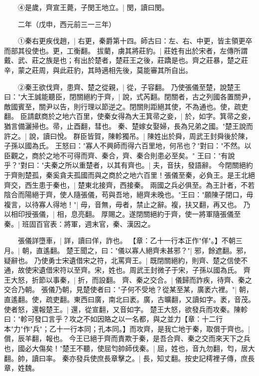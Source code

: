 　　④是歲，齊宣王薨，子閔王地立。|{
	閔，讀曰閔。
	}

　　二年（戊申，西元前三一三年）

　　①秦右更疾伐趙，|{
	右更，秦爵第十四。師古曰：左、右、中更，皆主領更卒而部其役使也。更，工衡翻。
	}
拔藺，虜其將莊豹。|{
	莊姓有出於宋者，左傳所謂戴、武、莊之族是也；有出於楚者，楚莊王之後，莊蹻是也。齊之莊暴，楚之莊辛，蒙之莊周，與此莊豹，其時適相先後，莫能審其所自出。
	}

　　②秦王欲伐齊，患齊、楚之從親，|{
	從，子容翻。
	}
乃使張儀至楚，說楚王曰："大王誠能聽臣，閉關絕約于齊，|{
	說，式芮翻。閉關者，古之列國各置關尹，敵國賓至，關尹以告，則行理以節逆之。閉關則距絕其使，不為通也。使，疏吏翻。
	}
臣請獻商於之地六百里，使秦女得為大王箕帚之妾，|{
	於，如字。箕帚之妾，猶言備灑掃也。帚，止酉翻，彗也。
	}
秦、楚嫁女娶婦，長為兄弟之國。"楚王說而許之。|{
	說，讀曰悅。
	}
群臣皆賀，陳軫獨吊。|{
	陳姓出於舜，周武王封舜後於陳，子孫以國為氏。
	}
王怒曰："寡人不興師而得六百里地，何吊也？"對曰："不然。以臣觀之，商於之地不可得而齊、秦合，齊、秦合則患必至矣。" 王曰："有說乎？"對曰："夫秦之所以重楚者，以其有齊也。|{
	夫，音扶，發語辭。
	}
今閉關絕約于齊則楚孤，秦奚貪夫孤國而與之商於之地六百里！張儀至秦，必負王。是王北絕齊交，西生患于秦也，|{
	楚東北接齊，西接秦。
	}
兩國之兵必俱至。為王計者，不若陰合而陽絕于齊，使人隨張儀，苟與吾地，絕齊未晚也。"王曰："願陳子閉口，毋複言，以待寡人得地！"|{
	毋，音無，毋者，禁止之辭。複，扶又翻，再又也。
	}
乃以相印授張儀，|{
	相，息亮翻。
	}
厚賜之。遂閉關絕約于齊，使一將軍隨張儀至秦。|{
	班固百官表：將軍，週末官，秦、漢因之。
	}

　　張儀詳墮車，|{
	詳，讀曰佯，詐也。
	}
【章：乙十一行本正作"佯"。】不朝三月。|{
	朝，直遙翻。
	}
楚王聞之，曰："儀以寡人絕齊未甚邪？"|{
	邪，餘遮翻。邪，疑辭也。
	}
乃使勇士宋遺借宋之符，北罵齊王。|{
	既閉關絕約，則齊、楚之信使不通，故使宋遺借宋符以至齊。宋，姓也。周武王封微子于宋，子孫以國為氏。
	}
齊王大怒，折節以事秦，|{
	折，而設翻。
	}
齊、秦之交合。|{
	儀歸而詐疾，待齊、秦之交合乃朝。
	}
張儀乃朝，見楚使者曰："子何不受地？從某至某，廣袤六裡。"|{
	朝，直遙翻。使，疏吏翻。東西曰廣，南北曰袤。廣，古曠翻，又讀如字。袤，音茂。
	}
使者怒，還報楚王。|{
	還，從宣翻，又音如字。
	}
楚王大怒，欲發兵而攻秦。陳軫曰："軫可發口言乎？攻之不如因賂之以一名都，與之並力【章：十二行本"力"作"兵"；乙十一行本同；孔本同。】而攻齊，是我亡地于秦，取償于齊也。|{
	償，辰羊翻，報也。
	}
今王已絕于齊而責欺于秦，是吾合齊、秦之交而來天下之兵也，國必大傷矣！"楚王不聽，使屈匄帥師伐秦。|{
	屈，姓也，音九勿翻，匄，居大翻。帥，讀曰率。
	}
秦亦發兵使庶長章擊之。|{
	長，知丈翻。按史記樗裡子傳，庶長章，姓魏。
	}

